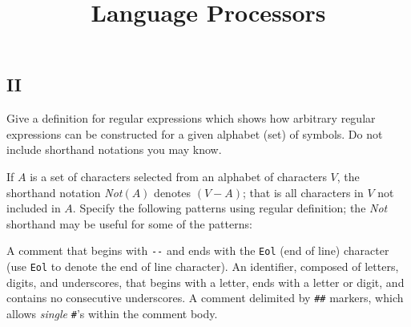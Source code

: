 
\begin{preamble}
\part{II}
\title{Language Processors}
\end{preamble}

\begin{questions}


\newenvironment{bnf}{
    \begin{tabbing}
    XXXXXX \= XXXX \= XXXXXXXXXXXXXXXXXXXXXXXXXXXXXXXXXX\kill}{
    \end{tabbing}
    }

\newcommand{\nt}[1]{{\it #1\/}}
\newcommand{\Or}[1]{\ \ $|$ \ \ #1}
\newcommand{\Rule}[2]{{\it #1} \> $\rightarrow$ \> #2}

\question

\begin{subquestions}

\subquestion

Give a definition for regular expressions which shows how
arbitrary regular expressions can be constructed for a
given alphabet (set) of symbols. Do not include shorthand
notations you may know.

\subquestion
If $A$ is a set of characters selected from an
alphabet of characters $V$, the shorthand notation {\it Not$(A)$} denotes 
$(V - A)$; that is all characters in $V$ not included in $A$.
Specify the following patterns using regular definition; 
the {\it Not\/} shorthand may be useful for some of the patterns:
\begin{subsubquestions}
\subsubquestion
A comment that begins with \verb"--" and ends with the \verb"Eol" 
(end of line) character (use \verb"Eol" to denote the end of line 
character).
\subsubquestion
An identifier, composed of letters, digits, and underscores, that
begins with a letter, ends with a letter or digit, and contains
no consecutive underscores.
\subsubquestion
A comment delimited by \verb"##" markers, which allows {\em single\/}
\verb"#"'s within the comment body.
\end{subsubquestions}


\end{subquestions}
\end{questions}
